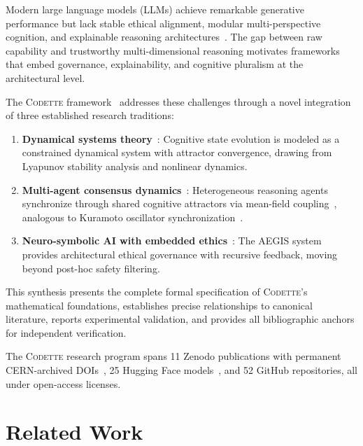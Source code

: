 \documentclass[conference]{IEEEtran}
\newcommand{\codette}{\textsc{Codette}}
\begin{document}
Modern large language models (LLMs) achieve remarkable generative performance but lack stable ethical alignment, modular multi-perspective cognition, and explainable reasoning architectures~\cite{bender2021dangers,bommasani2021opportunities}. The gap between raw capability and trustworthy multi-dimensional reasoning motivates frameworks that embed governance, explainability, and cognitive pluralism at the architectural level.

The \codette{} framework~\cite{harrison2026codettefull} addresses these challenges through a novel integration of three established research traditions:
\begin{enumerate}[leftmargin=*]
  \item \textbf{Dynamical systems theory}~\cite{khalil2002nonlinear,strogatz2015nonlinear}: Cognitive state evolution is modeled as a constrained dynamical system with attractor convergence, drawing from Lyapunov stability analysis and nonlinear dynamics.
  \item \textbf{Multi-agent consensus dynamics}~\cite{olfatisaber2007consensus,ren2005consensus}: Heterogeneous reasoning agents synchronize through shared cognitive attractors via mean-field coupling~\cite{lasry2007mean}, analogous to Kuramoto oscillator synchronization~\cite{kuramoto1984chemical,acebron2005kuramoto}.
  \item \textbf{Neuro-symbolic AI with embedded ethics}~\cite{garcez2019neural}: The AEGIS system~\cite{harrison2025aegisnexus} provides architectural ethical governance with recursive feedback, moving beyond post-hoc safety filtering.
\end{enumerate}

This synthesis presents the complete formal specification of \codette{}'s mathematical foundations, establishes precise relationships to canonical literature, reports experimental validation, and provides all bibliographic anchors for independent verification.

The \codette{} research program spans 11 Zenodo publications with permanent CERN-archived DOIs~\cite{harrison2025ethics,harrison2025dreamreal,harrison2025dreamcore,harrison2025aegisnexus,harrison2025codetteethical,harrison2025codettefinal,harrison2025healdette,harrison2026recursive,harrison2025citizenscience,harrison2026codettefull}, 25 Hugging Face models~\cite{harrison2025codettehf}, and 52 GitHub repositories, all under open-access licenses.

\section{Related Work}
\label{sec:related}
\end{document}
